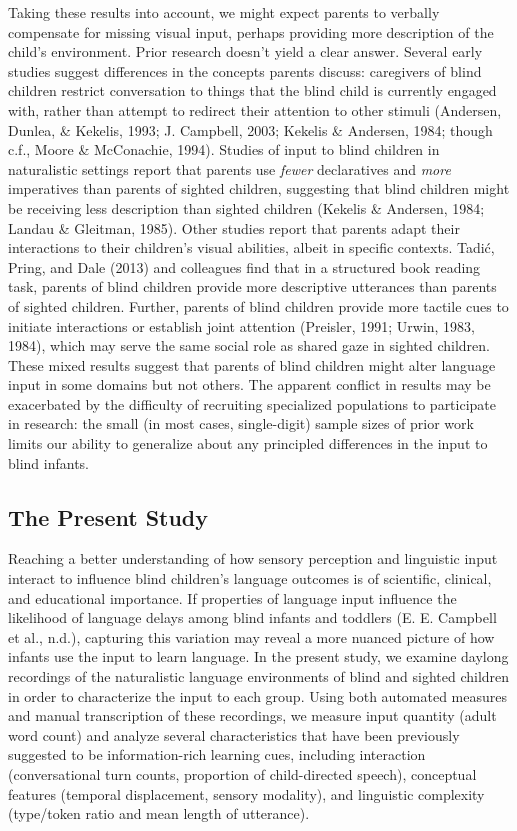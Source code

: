 \documentclass[
  man]{apa6}
\begin{document}
Taking these results into account, we might expect parents to verbally compensate for missing visual input, perhaps providing more description of the child's environment. Prior research doesn't yield a clear answer. Several early studies suggest differences in the concepts parents discuss: caregivers of blind children restrict conversation to things that the blind child is currently engaged with, rather than attempt to redirect their attention to other stimuli (Andersen, Dunlea, \& Kekelis, 1993; J. Campbell, 2003; Kekelis \& Andersen, 1984; though c.f., Moore \& McConachie, 1994). Studies of input to blind children in naturalistic settings report that parents use \emph{fewer} declaratives and \emph{more} imperatives than parents of sighted children, suggesting that blind children might be receiving less description than sighted children (Kekelis \& Andersen, 1984; Landau \& Gleitman, 1985). Other studies report that parents adapt their interactions to their children's visual abilities, albeit in specific contexts. Tadić, Pring, and Dale (2013) and colleagues find that in a structured book reading task, parents of blind children provide more descriptive utterances than parents of sighted children. Further, parents of blind children provide more tactile cues to initiate interactions or establish joint attention (Preisler, 1991; Urwin, 1983, 1984), which may serve the same social role as shared gaze in sighted children. These mixed results suggest that parents of blind children might alter language input in some domains but not others. The apparent conflict in results may be exacerbated by the difficulty of recruiting specialized populations to participate in research: the small (in most cases, single-digit) sample sizes of prior work limits our ability to generalize about any principled differences in the input to blind infants.

\hypertarget{the-present-study}{%
\subsection{The Present Study}\label{the-present-study}}

Reaching a better understanding of how sensory perception and linguistic input interact to influence blind children's language outcomes is of scientific, clinical, and educational importance. If properties of language input influence the likelihood of language delays among blind infants and toddlers (E. E. Campbell et al., n.d.), capturing this variation may reveal a more nuanced picture of how infants use the input to learn language. In the present study, we examine daylong recordings of the naturalistic language environments of blind and sighted children in order to characterize the input to each group. Using both automated measures and manual transcription of these recordings, we measure input quantity (adult word count) and analyze several characteristics that have been previously suggested to be information-rich learning cues, including interaction (conversational turn counts, proportion of child-directed speech), conceptual features (temporal displacement, sensory modality), and linguistic complexity (type/token ratio and mean length of utterance).
\end{document}
